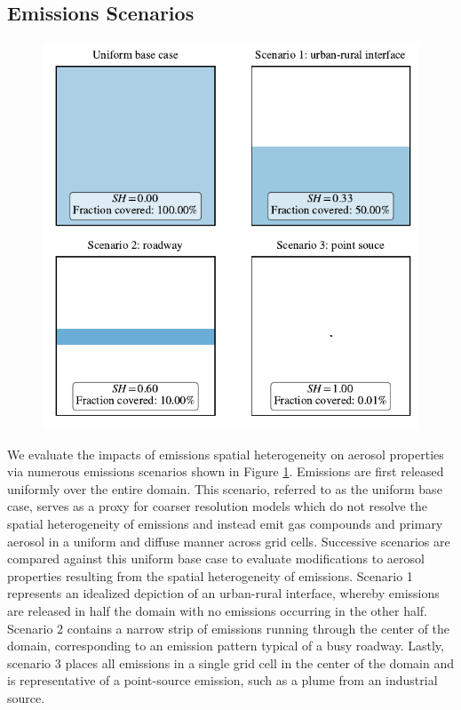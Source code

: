 \documentclass[journal abbreviation, manuscript]{copernicus}
\begin{document}
\subsection{Emissions Scenarios}

\begin{figure}[!t]
	\centering
	\includegraphics[]{figures/SH-scenarios.pdf}
	\caption{}
	\label{fig:sh-scenarios}
\end{figure} 

We evaluate the impacts of emissions spatial heterogeneity on aerosol properties via numerous emissions scenarios shown in Figure \ref{fig:sh-scenarios}. Emissions are first released uniformly over the entire domain. This scenario, referred to as the uniform base case, serves as a proxy for coarser resolution models which do not resolve the spatial heterogeneity of emissions and instead emit gas compounds and primary aerosol in a uniform and diffuse manner across grid cells. Successive scenarios are compared against this uniform base case to evaluate modifications to aerosol properties resulting from the spatial heterogeneity of emissions. Scenario 1 represents an idealized depiction of an urban-rural interface, whereby emissions are released in half the domain with no emissions occurring in the other half. Scenario 2 contains a narrow strip of emissions running through the center of the domain, corresponding to an emission pattern typical of a busy roadway. Lastly, scenario 3 places all emissions in a single grid cell in the center of the domain and is representative of a point-source emission, such as a plume from an industrial source.  
\end{document}
